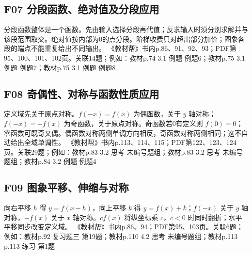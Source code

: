 \par\medskip\noindent\begin{minipage}{\linewidth}\subsection{F07 分段函数、绝对值及分段应用}
分段函数整体是一个函数。先由输入选择分段再代值；反求输入时须分别求解并与该段范围取交。绝对值按内部为0的点分段。阶梯收费只对超出部分加价；图象各段的端点不能重复给出不同输出。
{\small 《教材帮》书内p.86、91、92、93；PDF第95、100、101、102页。关联14题；例如：教材p.74 3.1 例题 例题6；教材p.75 3.1 例题 例题7；教材p.75 3.1 例题 例题8}\par\end{minipage}\par
\par\medskip\noindent\begin{minipage}{\linewidth}\subsection{F08 奇偶性、对称与函数性质应用}
定义域先关于原点对称。$f(-x)=f(x)$ 为偶函数，关于 $y$ 轴对称；$f(-x)=-f(x)$ 为奇函数，关于原点对称。奇函数若0有定义则 $f(0)=0$；零函数可既奇又偶。偶函数对称两侧单调方向相反，奇函数对称两侧相同；这不自动给出全域单调性。
{\small 《教材帮》书内p.113、114、115；PDF第122、123、124页。关联29题；例如：教材p.83 3.2 思考 未编号题组；教材p.83 3.2 思考 未编号题组；教材p.84 3.2 例题 例题4}\par\end{minipage}\par
\par\medskip\noindent\begin{minipage}{\linewidth}\subsection{F09 图象平移、伸缩与对称}
向右平移 $h$ 得 $y=f(x-h)$，向上平移 $k$ 得 $y=f(x)+k$；$f(-x)$ 关于 $y$ 轴对称，$-f(x)$ 关于 $x$ 轴对称。$cf(x)$ 将纵坐标乘 $c$，$c<0$ 时同时翻折；水平平移同步改变定义域。
{\small 《教材帮》书内p.86、94；PDF第95、103页。关联6题；例如：教材p.92 复习题三 第19题；教材p.110 4.2 思考 未编号题组；教材p.113 p.113 练习 第1题}\par\end{minipage}\par
